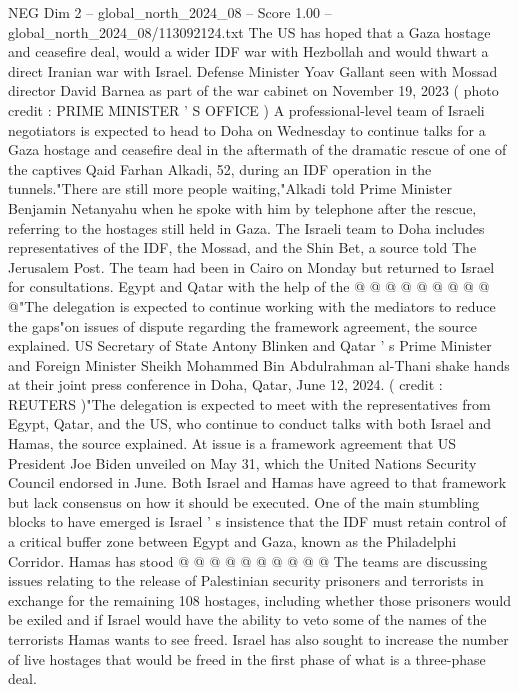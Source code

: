 \begin{textsample}{NEG Dim 2 – global\_north\_2024\_08 – Score 1.00 – global\_north\_2024\_08/113092124.txt}  \label{ex:f2_neg_056}
The US has hoped that a Gaza hostage and ceasefire deal, would a wider IDF war with Hezbollah and would thwart a direct Iranian war with Israel.
Defense Minister Yoav Gallant seen with Mossad director David Barnea as part of the war cabinet on November 19, 2023 ( photo credit : PRIME MINISTER ' S OFFICE ) A professional-level team of Israeli negotiators is expected to head to Doha on Wednesday to continue talks for a Gaza hostage and ceasefire deal in the aftermath of the dramatic rescue of one of the captives Qaid Farhan Alkadi, 52, during an IDF operation in the tunnels."There are still more people waiting,"Alkadi told Prime Minister Benjamin Netanyahu when he spoke with him by telephone after the rescue, referring to the hostages still held in Gaza.
The Israeli team to Doha includes representatives of the IDF, the Mossad, and the Shin Bet, a source told The Jerusalem Post.
The team had been in Cairo on Monday but returned to Israel for consultations.
Egypt and Qatar with the help of the @ @ @ @ @ @ @ @ @ @"The delegation is expected to continue working with the mediators to reduce the gaps"on issues of dispute regarding the framework agreement, the source explained.
US Secretary of State Antony Blinken and Qatar ' s Prime Minister and Foreign Minister Sheikh Mohammed Bin Abdulrahman al-Thani shake hands at their joint press conference in Doha, Qatar, June 12, 2024. ( credit : REUTERS )"The delegation is expected to meet with the representatives from Egypt, Qatar, and the US, who continue to conduct talks with both Israel and Hamas, the source explained.
At issue is a framework agreement that US President Joe Biden unveiled on May 31, which the United Nations Security Council endorsed in June.
Both Israel and Hamas have agreed to that framework but lack consensus on how it should be executed.
One of the main stumbling blocks to have emerged is Israel ' s insistence that the IDF must retain control of a critical buffer zone between Egypt and Gaza, known as the Philadelphi Corridor.
Hamas has stood @ @ @ @ @ @ @ @ @ @ The teams are discussing issues relating to the release of Palestinian security prisoners and terrorists in exchange for the remaining 108 hostages, including whether those prisoners would be exiled and if Israel would have the ability to veto some of the names of the terrorists Hamas wants to see freed.
Israel has also sought to increase the number of live hostages that would be freed in the first phase of what is a three-phase deal.

\end{textsample}

